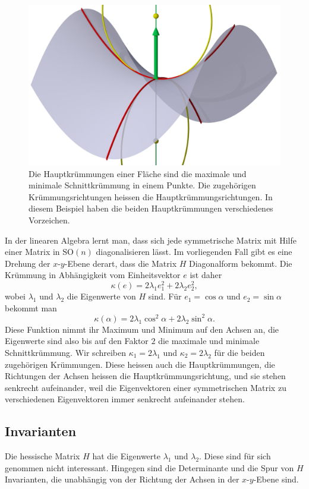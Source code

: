 \begin{figure}
\centering
\includegraphics[width=\hsize]{chapters/3d/hauptkruemmungen.jpg}
\caption{Die Hauptkrümmungen einer Fläche sind die maximale und minimale
Schnittkrümmung in einem Punkte.
Die zugehörigen Krümmungsrichtungen heissen die Hauptkrümmungsrichtungen.
In diesem Beispiel haben die beiden Hauptkrümmungen verschiedenes Vorzeichen.
\label{skript:kurven:hauptkruemmungen}}
\end{figure}

In der linearen Algebra lernt man, dass sich jede symmetrische Matrix 
mit Hilfe einer Matrix in $\textrm{SO}(n)$ diagonalisieren lässt.
Im vorliegenden Fall gibt es eine Drehung der $x$-$y$-Ebene derart, dass
die Matrix $H$ Diagonalform bekommt.
Die Krümmung in Abhängigkeit vom Einheitsvektor $e$ ist daher
\[
\kappa(e)
=
2\lambda_1 e_1^2 + 2\lambda_2 e_2^2,
\]
wobei $\lambda_1$ und $\lambda_2$ die Eigenwerte von $H$ sind.
Für $e_1=\cos\alpha$ und $e_2=\sin\alpha$ bekommt man
\[
\kappa(\alpha)
=
2\lambda_1 \cos^2\alpha + 2\lambda_2 \sin^2\alpha.
\]
Diese Funktion nimmt ihr Maximum und Minimum auf den Achsen an,
die Eigenwerte sind also bis auf den Faktor $2$ die maximale und minimale
Schnittkrümmung.
Wir schreiben $\kappa_1=2\lambda_1$ und $\kappa_2=2\lambda_2$ für die
beiden zugehörigen Krümmungen.
Diese heissen auch die Hauptkrümmungen, die Richtungen der Achsen heissen
die Hauptkrümmungsrichtung, und sie stehen senkrecht aufeinander, weil
die Eigenvektoren einer symmetrischen Matrix zu verschiedenen Eigenvektoren
immer senkrecht aufeinander stehen.

\subsection{Invarianten}
Die hessische Matrix $H$ hat die Eigenwerte $\lambda_1$ und $\lambda_2$.
Diese sind für sich genommen nicht interessant.
Hingegen sind die Determinante und die Spur von $H$ Invarianten, die
unabhängig von der Richtung der Achsen in der $x$-$y$-Ebene sind.

